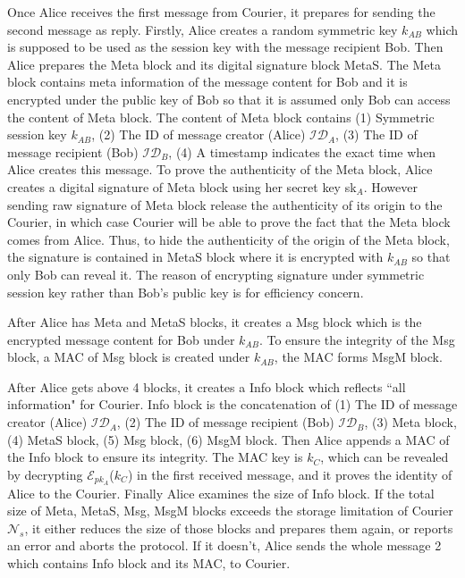 Once Alice receives the first message from Courier, it prepares for sending the second message as reply. Firstly, Alice creates a random symmetric key $ k_{AB} $ which is supposed to be used as the session key with the message recipient Bob. Then Alice prepares the Meta block and its digital signature block MetaS. The Meta block contains  meta information of the message content for Bob and it is encrypted under the public key of Bob so that it is assumed only Bob can access the content of Meta block. The content of Meta block contains (1) Symmetric session key $ k_{AB} $, (2) The ID of message creator (Alice) $ \mathcal{ID}_A $, (3) The ID of message recipient (Bob) $ \mathcal{ID}_B $, (4) A timestamp indicates the exact time when Alice creates this message. To prove the authenticity of the Meta block, Alice creates a digital signature of Meta block using her secret key sk$_A$. However sending raw signature of Meta block release the authenticity of its origin to the Courier, in which case Courier will be able to prove the fact that the Meta block comes from Alice. Thus, to hide the authenticity of the origin of the Meta block, the signature is contained in MetaS block where it is encrypted with $ k_{AB} $ so that only Bob can reveal it. The reason of encrypting signature under symmetric session key rather than Bob's public key is for efficiency concern.

After Alice has Meta and MetaS blocks, it creates a Msg block which is the encrypted message content for Bob under $ k_{AB} $. To ensure the integrity of the Msg block, a MAC of Msg block is created under $ k_{AB} $, the MAC forms MsgM block.

After Alice gets above 4 blocks, it creates a Info block which reflects ``all information" for Courier. Info block is the concatenation of (1) The ID of message creator (Alice) $ \mathcal{ID}_A $, (2) The ID of message recipient (Bob) $ \mathcal{ID}_B $, (3) Meta block, (4) MetaS block, (5) Msg block, (6) MsgM block. Then Alice appends a MAC of the Info block to ensure its integrity. The MAC key is $ k_C $, which can be revealed by decrypting $\mathcal{E}_{pk_A}$($k_C$) in the first received message, and it proves the identity of Alice to the Courier. Finally Alice examines the size of Info block. If the total size of Meta, MetaS, Msg, MsgM blocks exceeds the storage limitation of Courier $ \mathcal{N}_s $, it either reduces the size of those blocks and prepares them again, or reports an error and aborts the protocol. If it doesn't, Alice sends the whole message 2 which contains Info block and its MAC, to Courier.

